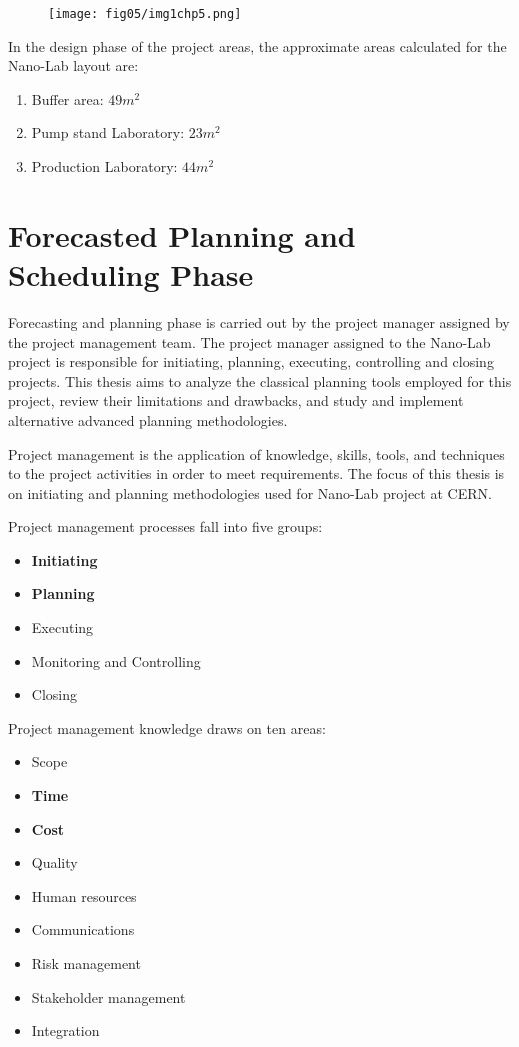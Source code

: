 \begin{figure}
	\centering
	\texttt{[image: fig05/img1chp5.png]}
\end{figure}

In the design phase of the project areas, the approximate areas calculated for the Nano-Lab layout are: 

\begin{enumerate}
	\item Buffer area: $49m^{2}$
	\item Pump stand Laboratory: $23m^{2}$
	\item Production Laboratory: $44m^{2}$
\end{enumerate}

\section {Forecasted Planning and Scheduling Phase} 

Forecasting and planning phase is carried out by the project manager assigned by the project management team. The project manager assigned to the Nano-Lab project is responsible for initiating, planning, executing, controlling and closing projects. This thesis aims to analyze the classical planning tools employed for this project, review their limitations and drawbacks, and study and implement alternative advanced planning methodologies. 

Project management is the application of knowledge, skills, tools, and techniques to the project activities in order to meet requirements. The focus of this thesis is on initiating and planning methodologies used for Nano-Lab project at CERN.

Project management processes \cite{PMBOK2013} fall into five groups:
\begin{itemize}
	\item  \textbf{Initiating}
	\item  \textbf{Planning}
	\item  Executing
	\item  Monitoring and Controlling
	\item  Closing
	
\end{itemize}

Project management knowledge \cite{PMBOK2013} draws on ten areas:
\begin{itemize}
	\item Scope
	\item \textbf{Time}
	\item \textbf{Cost}
	\item  Quality
	\item Human resources
	\item Communications
	\item Risk management
	\item Stakeholder management
	\item Integration
\end{itemize}

